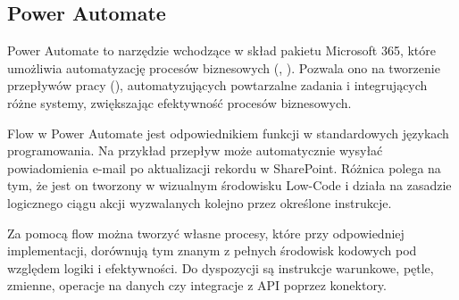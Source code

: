 \subsection{Power Automate \texorpdfstring{\cite{v-aangie_official_nodate}}{}}
Power Automate to narzędzie wchodzące w skład pakietu Microsoft 365, które umożliwia automatyzację procesów biznesowych (, ). Pozwala ono na tworzenie przepływów pracy (), automatyzujących powtarzalne zadania i integrujących różne systemy, zwiększając efektywność procesów biznesowych.

Flow w Power Automate jest odpowiednikiem funkcji w standardowych językach programowania. Na przykład przepływ może automatycznie wysyłać powiadomienia e-mail po aktualizacji rekordu w SharePoint. Różnica polega na tym, że jest on tworzony w wizualnym środowisku Low-Code i działa na zasadzie logicznego ciągu akcji wyzwalanych kolejno przez określone instrukcje.

Za pomocą flow można tworzyć własne procesy, które przy odpowiedniej implementacji, dorównują tym znanym z pełnych środowisk kodowych pod względem logiki i efektywności. Do dyspozycji są instrukcje warunkowe, pętle, zmienne, operacje na danych czy integracje z API poprzez konektory.
